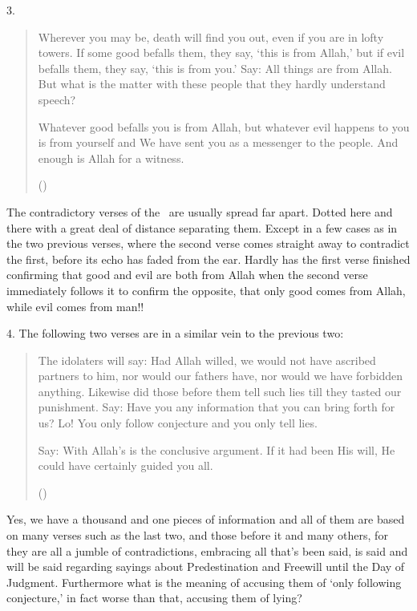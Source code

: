 \documentclass[12pt]{memoir}
\begin{document}
3.

\begin{quote}
Wherever you may be, death will find you out,
even if you are in lofty towers.
If some good befalls them, they say, ‘this is from Allah,’
but if evil befalls them, they say, ‘this is from you.’
Say: All things are from Allah.
But what is the matter with these people that they hardly understand speech?

Whatever good befalls you is from Allah,
but whatever evil happens to you is from yourself
and We have sent you as a messenger to the people.
And enough is Allah for a witness.

()
\end{quote}

The contradictory verses of the \Quran\ are usually spread far apart.
Dotted here and there with a great deal of distance separating them.
Except in a few cases as in the two previous verses,
where the second verse comes straight away to contradict the first,
before its echo has faded from the ear.
Hardly has the first verse finished confirming that good and evil
are both from Allah when the second verse immediately follows it
to confirm the opposite, that only good comes from Allah,
while evil comes from man!!

4. The following two verses are in a similar vein to the previous two:

\begin{quote}
The idolaters will say:
Had Allah willed, we would not have ascribed partners to him,
nor would our fathers have, nor would we have forbidden anything.
Likewise did those before them tell such lies till they tasted our punishment.
Say: Have you any information that you can bring forth for us?
Lo! You only follow conjecture and you only tell lies.

Say: With Allah’s is the conclusive argument.
If it had been His will, He could have certainly guided you all.

()
\end{quote}

Yes, we have a thousand and one pieces of information
and all of them are based on many verses such as the last two,
and those before it and many others,
for they are all a jumble of contradictions, embracing all that’s been said,
is said and will be said regarding sayings about Predestination and Freewill
until the Day of Judgment.
Furthermore what is the meaning of accusing them of
‘only following conjecture,’ in fact worse than that, accusing them of lying?
\end{document}
